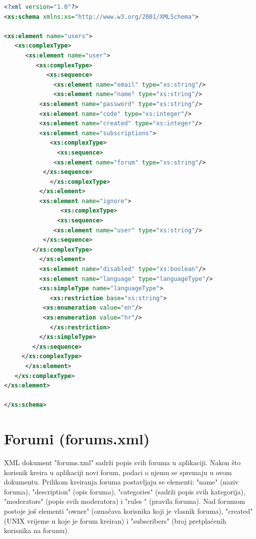 \documentclass{foi}
\begin{document}
\begin{lstlisting}[language=XML]
 <?xml version="1.0"?>
<xs:schema xmlns:xs="http://www.w3.org/2001/XMLSchema">

<xs:element name="users">
   <xs:complexType>
      <xs:element name="user">
         <xs:complexType>
            <xs:sequence>
              <xs:element name="email" type="xs:string"/>
              <xs:element name="name" type="xs:string"/>
	      <xs:element name="password" type="xs:string"/>
	      <xs:element name="code" type="xs:integer"/>
	      <xs:element name="created" type="xs:integer"/>
	      <xs:element name="subscriptions">
	         <xs:complexType>
	           <xs:sequence>
		      <xs:element name="forum" type="xs:string"/>
		   </xs:sequence>
	         </xs:complexType>
	      </xs:element>
	      <xs:element name="ignore">
                <xs:complexType>
	           <xs:sequence>
		      <xs:element name="user" type="xs:string"/>
 		   </xs:sequence>
		</xs:complexType>
	      </xs:element>
	      <xs:element name="disabled" type="xs:boolean"/>
	      <xs:element name="language" type="languageType"/>
	      <xs:simpleType name="languageType">
	         <xs:restriction base="xs:string">
		   <xs:enumeration value="en"/>
		   <xs:enumeration value="hr"/>
	         </xs:restriction>
	      </xs:simpleType>
	    </xs:sequence>
	 </xs:complexType>
      </xs:element>
   </xs:complexType>
</xs:element>

</xs:schema> 
\end{lstlisting}

\section{Forumi (forums.xml)}

XML dokument "forums.xml" sadrži popis svih foruma u aplikaciji. Nakon što korisnik kreira u aplikaciji novi forum, podaci o njemu se spremaju u ovom dokumentu. Prilikom kreiranja foruma postavljaju se elementi: "name" (naziv foruma), "description" (opis foruma), "categories" (sadrži popis svih kategorija), "moderators" (popis svih moderatora) i "rules " (pravila foruma). Nad forumom postoje još elementi "owner" (označava korisnika koji je vlasnik foruma), "created" (UNIX vrijeme u koje je forum kreiran) i "subscribers" (broj pretplaćenih korisnika na forumu).
\end{document}

